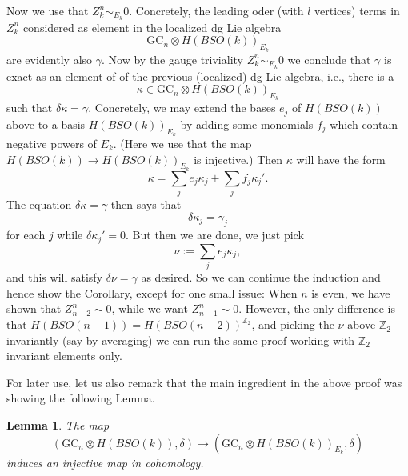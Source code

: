 \documentclass[a4paper]{amsart}
\theoremstyle{plain}
\newtheorem{lemma}[thm]{Lemma}
\theoremstyle{definition}
\newcommand{\Z}{{\mathbb{Z}}}
\newcommand{\GC}{\mathrm{GC}}
\newcommand{\SO}{\mathit{SO}}
\begin{document}
Now we use that $Z_k^n\sim_{E_k} 0$. Concretely, the leading oder (with $l$ vertices) terms in $Z_k^n$ considered as element in the localized dg Lie algebra 
\[
\GC_n \otimes H(B\SO(k))_{E_k}
\]
are evidently also $\gamma$. Now by the gauge triviality $Z_k^n\sim_{E_k} 0$ we conclude that $\gamma$ is exact as an element of of the previous (localized) dg Lie algebra, i.e., there is a 
\[
\kappa \in   \GC_n \otimes H(B\SO(k))_{E_k}
\]
such that $\delta\kappa = \gamma$.
Concretely, we may extend the bases $e_j$ of $H(B\SO(k))$ above to a basis $H(B\SO(k))_{E_k}$ by adding some monomials $f_j$ which contain negative powers of $E_k$. (Here we use that the map $H(B\SO(k))\to H(B\SO(k))_{E_k}$ is injective.)
Then $\kappa$ will have the form 
\[
\kappa = \sum_j e_j\kappa_j + \sum_j f_j \kappa_j'.
\]
The equation $\delta\kappa = \gamma$ then says that 
\[
\delta \kappa_j =\gamma_j
\]
for each $j$ while $\delta \kappa_j'=0$.
But then we are done, we just pick 
\[
\nu := \sum_j e_j \kappa_j,
\] 
and this will satisfy $\delta\nu = \gamma$ as desired. So we can continue the induction and hence show the Corollary, except for one small issue:
When $n$ is even, we have shown that $Z_{n-2}^n\sim 0$, while we want $Z_{n-1}^n\sim 0$.
However, the only difference is that $H(B\SO(n-1))= H(B\SO(n-2))^{\Z_2}$, and picking the $\nu$ above $\Z_2$ invariantly (say by averaging) we can run the same proof working with $\Z_2$-invariant elements only. 

For later use, let us also remark that the main ingredient in the above proof was showing the following Lemma.
\begin{lemma}
The map
\[
(\GC_n \otimes H(B\SO(k)), \delta)
\to
(\GC_n \otimes H(B\SO(k))_{E_k}, \delta)
\]
induces an injective map in cohomology.
\end{lemma}
\end{document}
